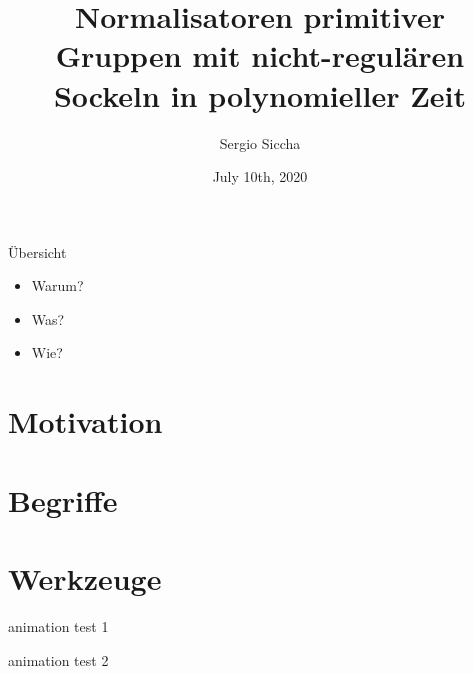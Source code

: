 \documentclass{beamer}
\title{Normalisatoren primitiver Gruppen mit nicht-regulären
Sockeln in polynomieller Zeit}
\date{July 10th, 2020}
\author{Sergio Siccha}
\theoremstyle{plain}
\theoremstyle{definition}
\begin{document}
\maketitle
{}



\begin{frame}{Übersicht}
\begin{itemize}
\setlength{\itemsep}{\fill}
\item Warum?
\item Was?
\item Wie?
\end{itemize}
\end{frame}

\section{Motivation}


\section{Begriffe}


\section{Werkzeuge}


\begin{frame}{animation test 1}
\begin{center}
\end{center}
\end{frame}


\begin{frame}{animation test 2}
\begin{center}
\end{center}
\end{frame}
\end{document}
